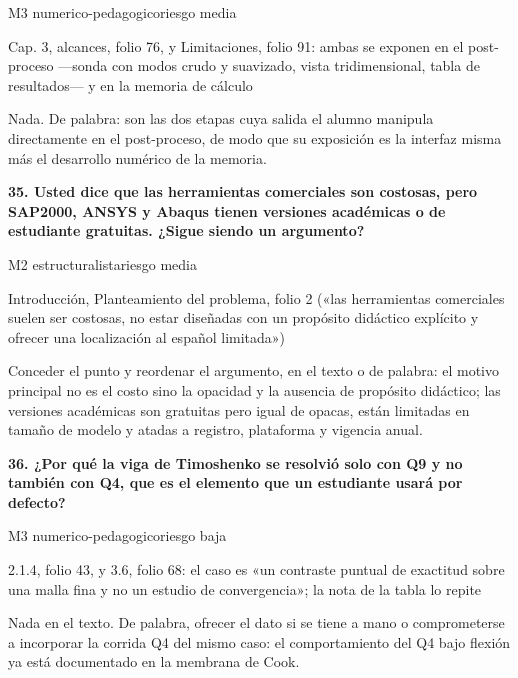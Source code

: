 {\small\color{gris}\sffamily M3 numerico-pedagogico\quad{}\quad riesgo media}\par
{\small{}Cap. 3, alcances, folio 76, y Limitaciones, folio 91: ambas se exponen en el post-proceso —sonda con modos crudo y suavizado, vista tridimensional, tabla de resultados— y en la memoria de cálculo\par}
{\small{}Nada. De palabra: son las dos etapas cuya salida el alumno manipula directamente en el post-proceso, de modo que su exposición es la interfaz misma más el desarrollo numérico de la memoria.\par}
\vspace{5pt}
\noindent\casilla\textbf{35. Usted dice que las herramientas comerciales son costosas, pero SAP2000, ANSYS y Abaqus tienen versiones académicas o de estudiante gratuitas. ¿Sigue siendo un argumento?}\par
{\small\color{gris}\sffamily M2 estructuralista\quad{}\quad riesgo media}\par
{\small{}Introducción, Planteamiento del problema, folio 2 («las herramientas comerciales suelen ser costosas, no estar diseñadas con un propósito didáctico explícito y ofrecer una localización al español limitada»)\par}
{\small{}Conceder el punto y reordenar el argumento, en el texto o de palabra: el motivo principal no es el costo sino la opacidad y la ausencia de propósito didáctico; las versiones académicas son gratuitas pero igual de opacas, están limitadas en tamaño de modelo y atadas a registro, plataforma y vigencia anual.\par}
\vspace{5pt}
\noindent\casilla\textbf{36. ¿Por qué la viga de Timoshenko se resolvió solo con Q9 y no también con Q4, que es el elemento que un estudiante usará por defecto?}\par
{\small\color{gris}\sffamily M3 numerico-pedagogico\quad{}\quad riesgo baja}\par
{\small{}2.1.4, folio 43, y 3.6, folio 68: el caso es «un contraste puntual de exactitud sobre una malla fina y no un estudio de convergencia»; la nota de la tabla lo repite\par}
{\small{}Nada en el texto. De palabra, ofrecer el dato si se tiene a mano o comprometerse a incorporar la corrida Q4 del mismo caso: el comportamiento del Q4 bajo flexión ya está documentado en la membrana de Cook.\par}
\vspace{5pt}
\clearpage
